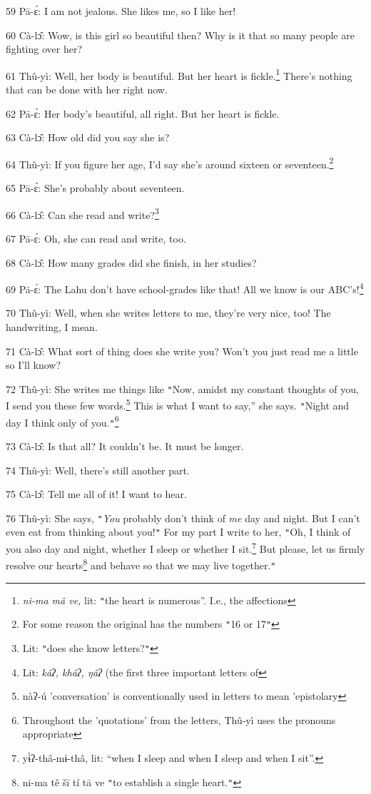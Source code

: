 59 Pā-ɛ́: I am not jealous. She likes me, so I like her!

60 Cà-lɔ̂: Wow, is this girl so beautiful then? Why is it that so many people
are fighting over her?

61 Thû-yì: Well, her body is beautiful. But her heart is fickle.\footnote{\textit{ni-ma mâ ve,} lit: \texttt{"}the heart is numerous''. I.e., the affections} There's
nothing that can be done with her right now.

62 Pā-ɛ́: Her body's beautiful, all right. But her heart is fickle.

63 Cà-lɔ̂: How old did you say she is?

64 Thû-yì: If you figure her age, I'd say she's around sixteen or seventeen.\footnote{For some reason the original has the numbers \texttt{"}16 or 17\texttt{"}}

65 Pā-ɛ́: She's probably about seventeen.

66 Cà-lɔ̂: Can she read and write?\footnote{Lit: \texttt{"}does she know letters?\texttt{"}}

67 Pā-ɛ́: Oh, she can read and write, too.

68 Cà-lɔ̂: How many grades did she finish, in her studies?

69 Pā-ɛ́: The Lahu don't have school-grades like that! All we know is our ABC's!\footnote{Lit: \textit{kâʔ, khâʔ, ŋâʔ} (the first three important letters of}

70 Thû-yì: Well, when she writes letters to me, they're very nice, too! The handwriting,
I mean.

71 Cà-lɔ̂: What sort of thing does she write you? Won't you just read me a little
so I'll know?

72 Thû-yì: She writes me things like \texttt{"}Now, amidst my constant thoughts
of you, I send you these few words.\footnote{nàʔ-ú 'conversation' is conventionally used in letters to mean 'epistolary} This is what I want to say,'' she says.
\texttt{"}Night and day I think only of you.\texttt{"}\footnote{Throughout the 'quotations' from the letters, Thû-yì uses the pronouns appropriate}

73 Cà-lɔ̂: Is that all? It couldn't be. It must be longer.

74 Thû-yì: Well, there's still another part.

75 Cà-lɔ̂: Tell me all of it! I want to hear.

76 Thû-yì: She says, \texttt{"}\textit{You} probably don't think of \textit{me}
day and night. But I can't even eat from thinking about you!\texttt{"} For my part
I write to her, \texttt{"}Oh, I think of you also day and night, whether I sleep
or whether I sit.\footnote{yɨ̀ʔ-thâ-mɨ-thâ, lit: ``when I sleep and when I sleep and when I sit''.} But please, let us firmly resolve our hearts\footnote{ni-ma tê šī tí tā ve \texttt{"}to establish a single heart.\texttt{"}} and behave
so that we may live together.\texttt{"}

